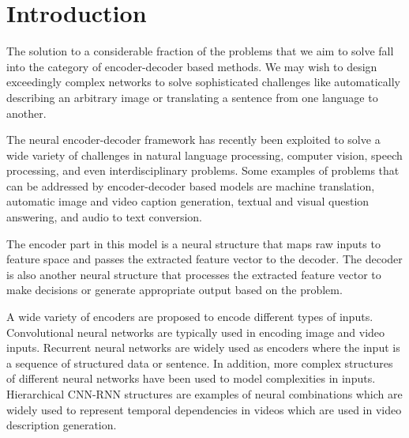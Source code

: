 \documentclass[preprint, 12pt]{elsarticle}
\begin{document}
\begin{frontmatter}
		\begin{keyword}
			
			
			
		\end{keyword}
		
	\end{frontmatter}

	\newpage	
	
	\tableofcontents

	\newpage

	
	\section{Introduction}
	The solution to a considerable fraction of the problems that we aim to solve fall into the category of encoder-decoder based methods. We may wish to design exceedingly complex networks to solve sophisticated challenges like automatically describing an arbitrary image or translating a sentence from one language to another. 
	
	The neural encoder-decoder framework has recently been exploited to solve a wide variety of challenges in natural language processing, computer vision, speech processing, and even interdisciplinary problems. Some examples of problems that can be addressed by encoder-decoder based models are machine translation, automatic image and video caption generation, textual and visual question answering, and audio to text conversion.
	
	The encoder part in this model is a neural structure that maps raw inputs to feature space and passes the extracted feature vector to the decoder. The decoder is also another neural structure that processes the extracted feature vector to make decisions or generate appropriate output based on the problem.
	
	A wide variety of encoders are proposed to encode different types of inputs. Convolutional neural networks are typically used in encoding image and video inputs. Recurrent neural networks are widely used as encoders where the input is a sequence of structured data or sentence. In addition, more complex structures of different neural networks have been used to model complexities in inputs. Hierarchical CNN-RNN structures are examples of neural combinations which are widely used to represent temporal dependencies in videos which are used in video description generation.
	
\end{document}
